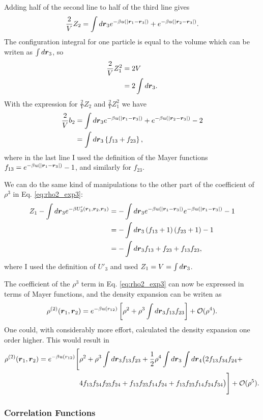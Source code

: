 Adding half of the second line to half of the third line gives
\begin{align}
\frac{2}{V}Z_2 = \int d\boldsymbol{r}_3 
e^{-\beta u(|\boldsymbol{r}_1 - \boldsymbol{r}_3|)} + 
e^{-\beta u(|\boldsymbol{r}_2 - \boldsymbol{r}_3|)}.
\end{align}
The configuration integral for one particle is equal to the volume which can be writen as $\int d\boldsymbol{r}_3$, so
\begin{align}
\frac{2}{V} Z_1^2 &= 2 V \\
&= 2 \int d\boldsymbol{r}_3.
\end{align}
With the expression for $\frac{2}{V}Z_2$ and $\frac{2}{V}Z_1^2$ we have
\begin{align}
\frac{2}{V} b_2 &= \int d\boldsymbol{r}_3 
    e^{-\beta u(|\boldsymbol{r}_1 - \boldsymbol{r}_3|)} + 
    e^{-\beta u(|\boldsymbol{r}_2 - \boldsymbol{r}_3|)} - 2\\
&= \int d\boldsymbol{r}_3 \left\{ f_{13} + f_{23} \right\},
\end{align}
where in the last line I used the definition of the Mayer functions $f_{13} = e^{-\beta u(|\boldsymbol{r}_1 - \boldsymbol{r}_3|)} - 1$,
and similarly for $f_{23}$.

We can do the same kind of manipulations to the other part
of the coefficient of $\rho^3$ in Eq. \eqref{eq:rho2_exp3}:
\begin{align}
Z_1 -  \int d\boldsymbol{r}_3 e^{-\beta U'_3(\boldsymbol{r}_1,\boldsymbol{r}_2,\boldsymbol{r}_3)} &=
    - \int d\boldsymbol{r}_3 e^{-\beta u(|\boldsymbol{r}_1 - \boldsymbol{r}_3|)} 
    e^{-\beta u(|\boldsymbol{r}_1 - \boldsymbol{r}_3|)} -1 \\
&= - \int d\boldsymbol{r}_3 \left(f_{13}+ 1\right)\left(f_{23}+ 1\right) -1\\
&= - \int d\boldsymbol{r}_3 f_{13}+ f_{23} + f_{13}f_{23},
\end{align}
where I used the definition of $U'_3$ and used $Z_1=V=\int d\boldsymbol{r}_3$.

The coefficient of the $\rho^3$ term in Eq. \eqref{eq:rho2_exp3} can now be expressed in terms of Mayer functions, and the density expansion can be writen as
\begin{align}
\rho^{(2)}(\boldsymbol{r}_1,\boldsymbol{r}_2) = e^{-\beta u(r_{12})}
    \left[ \rho^2 + \rho^3 \int d\boldsymbol{r}_3 f_{13}f_{23} \right]
    + \mathcal{O}(\rho^4).
\end{align}
One could, with considerably more effort, calculated the density expansion one order higher.
This would result in
\begin{align}
\rho^{(2)}(\boldsymbol{r}_1,\boldsymbol{r}_2) = e^{-\beta u(r_{12})}
    \Bigg[& \rho^2 + \rho^3 \int d\boldsymbol{r}_3 f_{13}f_{23} 
        +\frac{1}{2} \rho^4 \int d\boldsymbol{r}_3 \int d\boldsymbol{r}_4
        \big( 2 f_{13}f_{34}f_{24} + \nonumber \\
            &4f_{13}f_{34}f_{23}f_{24} +
            f_{13}f_{23}f_{14}f_{24} +
            f_{13}f_{23}f_{14}f_{24}f_{34}
        \big)
    \Bigg]
    + \mathcal{O}(\rho^5).
\end{align}

\subsubsection{Correlation Functions}
